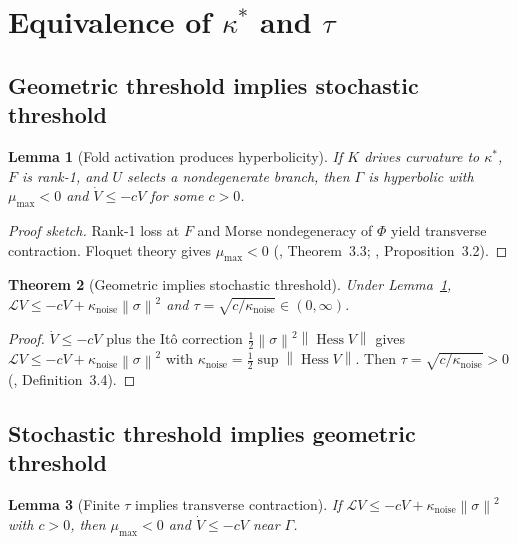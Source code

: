 \documentclass[12pt]{article}
\numberwithin{equation}{section}
\newtheorem{theorem}{Theorem}[section]
\newtheorem{lemma}[theorem]{Lemma}
\theoremstyle{remark}
\newcommand{\Orb}{\Gamma}
\newcommand{\cL}{\mathcal{L}}
\newcommand{\norm}[1]{\left\|#1\right\|}
\DeclareMathOperator{\Hess}{Hess}
\begin{document}
\section{Equivalence of \texorpdfstring{$\kappa^*$}{kappa*} and
  \texorpdfstring{$\tau$}{tau}}
\label{sec:threshold-equiv}

\subsection{Geometric threshold implies stochastic threshold}

\begin{lemma}[Fold activation produces hyperbolicity]
\label{lem:fold-hyp}
If $K$ drives curvature to $\kappa^*$, $F$ is rank-1, and $U$
selects a nondegenerate branch, then $\Orb$ is hyperbolic with
$\mu_{\max}<0$ and $\dot V\le -cV$ for some $c>0$.
\end{lemma}

\begin{proof}[Proof sketch]
Rank-1 loss at $F$ and Morse nondegeneracy of $\Phi$ yield
transverse contraction. Floquet theory gives $\mu_{\max}<0$
(\cite{PO1}, Theorem~3.3; \cite{Paper1}, Proposition~3.2).
\end{proof}

\begin{theorem}[Geometric implies stochastic threshold]
\label{thm:geom-stoch}
Under Lemma~\ref{lem:fold-hyp},
$\cL V\le -cV+\kappa_{\mathrm{noise}}\norm{\sigma}^2$
and $\tau=\sqrt{c/\kappa_{\mathrm{noise}}}\in(0,\infty)$.
\end{theorem}

\begin{proof}
$\dot V\le -cV$ plus the It\^{o} correction
$\frac{1}{2}\norm{\sigma}^2\norm{\Hess V}$ gives
$\cL V\le -cV+\kappa_{\mathrm{noise}}\norm{\sigma}^2$
with $\kappa_{\mathrm{noise}}=\frac{1}{2}\sup\norm{\Hess V}$.
Then $\tau=\sqrt{c/\kappa_{\mathrm{noise}}}>0$
(\cite{Paper1}, Definition~3.4).
\end{proof}

\subsection{Stochastic threshold implies geometric threshold}

\begin{lemma}[Finite $\tau$ implies transverse contraction]
\label{lem:tau-contract}
If $\cL V\le -cV+\kappa_{\mathrm{noise}}\norm{\sigma}^2$ with
$c>0$, then $\mu_{\max}<0$ and $\dot V\le -cV$ near $\Orb$.
\end{lemma}
\end{document}
